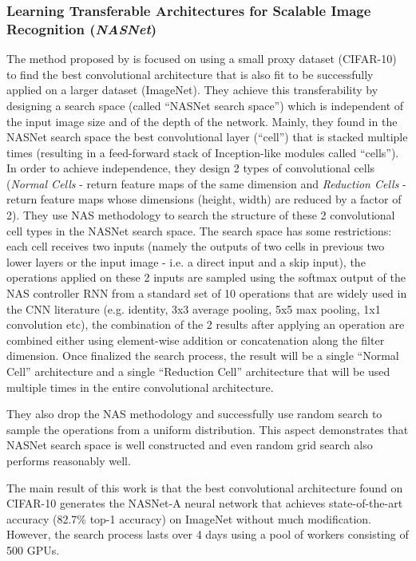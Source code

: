 \documentclass[11pt,a4paper]{article}
\begin{document}
\subsubsection{Learning Transferable Architectures for Scalable Image Recognition (\textit{NASNet})}
\label{summary:nasnet}

The method proposed by \citet{Zoph2018} is focused on using a small proxy dataset (CIFAR-10) to find the best convolutional architecture that is also fit to be successfully applied on a larger dataset (ImageNet). They achieve this transferability by designing a search space (called “NASNet search space”) which is independent of the input image size and of the depth of the network. Mainly, they found in the NASNet search space the best convolutional layer (“cell”) that is stacked multiple times (resulting in a feed-forward stack of Inception-like modules called “cells”). In order to achieve independence, they design 2 types of convolutional cells (\textit{Normal Cells} - return feature maps of the same dimension and \textit{Reduction Cells} - return feature maps whose dimensions (height, width) are reduced by a factor of 2). They use NAS methodology to search the structure of these 2 convolutional cell types in the NASNet search space. The search space has some restrictions: each cell receives two inputs (namely the outputs of two cells in previous two lower layers or the input image - i.e. a direct input and a skip input), the operations applied on these 2 inputs are sampled using the softmax output of the NAS controller RNN from a standard set of 10 operations that are widely used in the CNN literature (e.g. identity, 3x3 average pooling, 5x5 max pooling, 1x1 convolution etc), the combination of the 2 results after applying an operation are combined either using element-wise addition or concatenation along the filter dimension. Once finalized the search process, the result will be a single “Normal Cell” architecture and a single “Reduction Cell” architecture that will be used multiple times in the entire convolutional architecture.

They also drop the NAS methodology and successfully use random search to sample the operations from a uniform distribution. This aspect demonstrates that NASNet search space  is well constructed and even random grid search also performs reasonably well. 

The main result of this work is that the best convolutional architecture found on CIFAR-10 generates the NASNet-A neural network that achieves state-of-the-art accuracy (82.7\% top-1 accuracy) on ImageNet without much modification. However, the search process lasts over 4 days using a pool of workers consisting of 500 GPUs.
\end{document}
